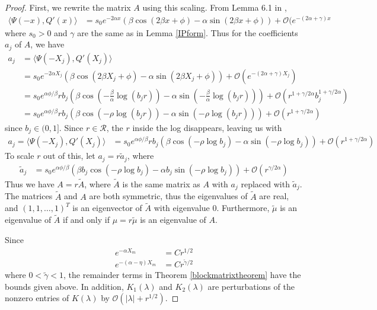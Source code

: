 \documentclass[thesis.tex]{subfiles}
\begin{document}
\begin{lemma}
\begin{proof}
First, we rewrite the matrix $A$ using this scaling. From Lemma 6.1 in \cite{Sandstede1998},
\begin{align*}\label{IPpsiQprime}
\langle \Psi(-x), Q'(x) \rangle
&= s_0 e^{-2 \alpha x}\left( \beta \cos(2 \beta x + \phi) - \alpha \sin(2 \beta x + \phi)\right) + \mathcal{O}(e^{-(2 \alpha + \gamma) x}
\end{align*}
where $s_0 > 0$ and $\gamma$ are the same as in Lemma \ref{IPform}. Thus for the coefficients $a_j$ of $A$, we have
\begin{align*}
a_j &= \langle \Psi(-X_j), Q'(X_j) \rangle \\
&= s_0 e^{-2 \alpha X_j}\left( \beta \cos(2 \beta X_j + \phi) - \alpha \sin(2 \beta X_j + \phi)\right) + \mathcal{O}(e^{-(2 \alpha + \gamma) X_j}) \\
&= s_0 e^{\alpha \phi/\beta} r b_j \left( \beta \cos\left( -\frac{\beta}{\alpha} \log(b_j r) \right) - \alpha \sin \left( -\frac{\beta}{\alpha} \log(b_j r) \right) \right) + \mathcal{O}(r^{1+\gamma/2\alpha} b_j^{1 + \gamma/2\alpha}) \\
&= s_0 e^{\alpha \phi/\beta} r b_j \left( \beta \cos\left( -\rho \log(b_j r) \right) - \alpha \sin \left( -\rho \log(b_j r) \right) \right) + \mathcal{O}(r^{1+\gamma/2\alpha})
\end{align*}
since $b_j \in (0, 1]$. Since $r \in \mathcal{R}$, the $r$ inside the log disappears, leaving us with
\begin{align*}
a_j = \langle \Psi(-X_j), Q'(X_j) \rangle 
&= s_0 e^{\alpha \phi/\beta} r b_j \left( \beta \cos\left( -\rho \log b_j \right) - \alpha \sin \left( -\rho \log b_j \right) \right) + \mathcal{O}(r^{1+\gamma/2\alpha})
\end{align*}
To scale $r$ out of this, let $a_j = r \tilde{a}_j$, where
\begin{align*}
\tilde{a}_j 
&= s_0 e^{\alpha \phi/\beta} \left( \beta b_j \cos\left( -\rho \log b_j \right) - \alpha b_j \sin \left( -\rho \log b_j  \right) \right) + \mathcal{O}(r^{\gamma/2\alpha})
\end{align*}
Thus we have $A = r \tilde{A}$, where $\tilde{A}$ is the same matrix as $A$ with $a_j$ replaced with $\tilde{a}_j$. The matrices $\tilde{A}$ and $A$ are both symmetric, thus the eigenvalues of $\tilde{A}$ are real, and $(1,1,\dots,1)^T$ is an eigenvector of $\tilde{A}$ with eigenvalue 0. Furthermore, $\tilde{\mu}$ is an eigenvalue of $\tilde{A}$ if and only if $\mu = r \tilde{\mu}$ is an eigenvalue of $A$.

Since
\begin{align*}
e^{-\alpha X_m} &= C r^{1/2} \\
e^{-(\alpha - \eta) X_m} &= C r^{\tilde{\gamma}/2}
\end{align*}
where $0 < \tilde{\gamma} < 1$, the remainder terms in Theorem \ref{blockmatrixtheorem} have the bounds given above. In addition, $K_1(\lambda)$ and $K_2(\lambda)$ are perturbations of the nonzero entries of $K(\lambda)$ by $\mathcal{O}(|\lambda| + r^{1/2})$.


\end{proof}
\end{lemma}
\end{document}
